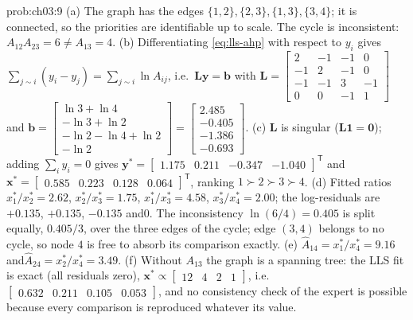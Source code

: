 \begin{sol}{prob:ch03:9}
(a) The graph has the edges $\{1,2\},\{2,3\},\{1,3\},\{3,4\}$; it is connected, so the priorities are identifiable up to scale. The cycle is inconsistent: $A_{12}A_{23}=6\neq A_{13}=4$.
(b) Differentiating \eqref{eq:lls-ahp} with respect to $y_i$ gives $\sum_{j\sim i}(y_i-y_j)=\sum_{j\sim i}\ln A_{ij}$, i.e.\ $\mathbf{L}\bm{y}=\bm{b}$ with
$\mathbf{L}=\begin{bmatrix}2&-1&-1&0\\-1&2&-1&0\\-1&-1&3&-1\\0&0&-1&1\end{bmatrix}$ and
$\bm{b}=\begin{bmatrix}\ln3+\ln4\\ -\ln3+\ln2\\ -\ln2-\ln4+\ln2\\ -\ln2\end{bmatrix}=\begin{bmatrix}2.485\\-0.405\\-1.386\\-0.693\end{bmatrix}$.
(c) $\mathbf{L}$ is singular ($\mathbf{L}\mathbf{1}=\mathbf{0}$); adding $\sum_iy_i=0$ gives $\bm{y}^{*}=\begin{bmatrix}1.175&0.211&-0.347&-1.040\end{bmatrix}^{\mathsf T}$ and\allowbreak $\bm{x}^{*}=\begin{bmatrix}0.585&0.223&0.128&0.064\end{bmatrix}^{\mathsf T}$, ranking $1\succ2\succ3\succ4$.
(d) Fitted ratios $x_1^{*}/x_2^{*}=2.62$, $x_2^{*}/x_3^{*}=1.75$, $x_1^{*}/x_3^{*}=4.58$, $x_3^{*}/x_4^{*}=2.00$; the log-residuals are $+0.135$, $+0.135$, $-0.135$ and\allowbreak $0$. The inconsistency $\ln(6/4)=0.405$ is split equally, $0.405/3$, over the three edges of the cycle; edge $(3,4)$ belongs to no cycle, so node $4$ is free to absorb its comparison exactly.
(e) $\widehat{A}_{14}=x_1^{*}/x_4^{*}=9.16$ and\allowbreak $\widehat{A}_{24}=x_2^{*}/x_4^{*}=3.49$.
(f) Without $A_{13}$ the graph is a spanning tree: the LLS fit is exact (all residuals zero), $\bm{x}^{*}\propto\begin{bmatrix}12&4&2&1\end{bmatrix}$, i.e.\ $\begin{bmatrix}0.632&0.211&0.105&0.053\end{bmatrix}$, and no consistency check of the expert is possible because every comparison is reproduced whatever its value.
\end{sol}

